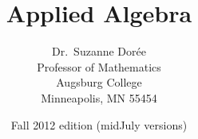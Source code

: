 

\documentclass[11pt]{book}

\usepackage{AA}










\frontmatter

\title{Applied Algebra}
\author{Dr.\ Suzanne Dor\'ee \\ Professor of Mathematics\\Augsburg College\\Minneapolis, MN 55454}
\date{Fall 2012 edition (midJuly versions)}
\maketitle

